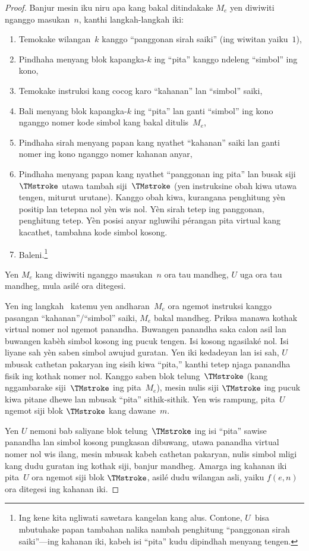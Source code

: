 \documentclass[../../../include/open-logic-section]{subfiles}
\begin{document}
\begin{proof}
  Banjur mesin iku niru apa kang bakal ditindakake
  $M_e$ yen diwiwiti nganggo masukan~$n$, kanthi
  langkah-langkah iki:
  \begin{enumerate}
    \item Temokake wilangan~$k$ kanggo ``panggonan
    sirah saiki'' (ing wiwitan yaiku~$1$),
    \item Pindhaha menyang blok kapangka-$k$ ing
    ``pita'' kanggo ndeleng ``simbol'' ing kono,
    \item{}%
    Temokake instruksi kang cocog karo ``kahanan''
    lan ``simbol'' saiki,
    \item Bali menyang blok kapangka-$k$ ing ``pita''
    lan ganti ``simbol'' ing kono nganggo nomer
    kode simbol kang bakal ditulis~$M_e$,
    \item Pindhaha sirah menyang papan kang nyathet
    ``kahanan'' saiki lan ganti nomer ing kono
    nganggo nomer kahanan anyar,
    \item Pindhaha menyang papan kang nyathet
    ``panggonan ing pita'' lan busak
    siji~$\TMstroke$ utawa tambah siji~$\TMstroke$
    (yen instruksine obah kiwa utawa tengen,
    miturut urutane). Kanggo obah kiwa, kurangana penghitung yèn positip lan tetepna nol yèn wis nol. Yèn sirah tetep ing panggonan, penghitung tetep. Yèn posisi anyar ngluwihi pérangan pita virtual kang kacathet, tambahna kode simbol kosong.
    \item Baleni.\footnote{Ing kene kita ngliwati
    sawetara kangelan kang alus. Contone, $U$~bisa
    mbutuhake papan tambahan nalika nambah penghitung
    ``panggonan sirah saiki''---ing kahanan iki,
    kabeh isi ``pita'' kudu dipindhah menyang tengen.}
  \end{enumerate}
  Yen $M_e$ kang diwiwiti nganggo masukan~$n$
  ora tau mandheg, $U$ uga ora tau mandheg,
  mula asilé ora ditegesi.

  Yen ing langkah~ katemu yen
  andharan~$M_e$ ora ngemot instruksi kanggo
  pasangan ``kahanan''/``simbol'' saiki,
  $M_e$ bakal mandheg. Priksa manawa kothak virtual nomer nol ngemot panandha. Buwangen panandha saka calon asil lan buwangen kabèh simbol kosong ing pucuk tengen. Isi kosong ngasilaké nol. Isi liyane sah yèn saben simbol awujud guratan. Yen iki kedadeyan lan isi sah,
  $U$ mbusak cathetan pakaryan ing sisih kiwa
  ``pita,'' kanthi tetep njaga panandha fisik ing kothak nomer nol. Kanggo saben blok telung~$\TMstroke$
  (kang nggambarake siji~$\TMstroke$ ing pita~$M_e$),
  mesin nulis siji $\TMstroke$ ing pucuk kiwa
  pitane dhewe lan mbusak ``pita'' sithik-sithik.
  Yen wis rampung, pita~$U$ ngemot siji blok
  $\TMstroke$ kang dawane~$m$.
  
  Yen $U$ nemoni bab saliyane blok telung~$\TMstroke$
  ing isi ``pita'' sawise panandha lan simbol kosong pungkasan dibuwang, utawa panandha virtual nomer nol wis ilang, mesin mbusak kabeh cathetan pakaryan, nulis simbol mligi kang dudu guratan ing kothak siji, banjur mandheg. Amarga
  ing kahanan iki pita~$U$ ora ngemot siji blok
  $\TMstroke$, asilé dudu wilangan asli,
  yaiku $f(e,n)$ ora ditegesi ing kahanan iki.
\end{proof}
\end{document}
